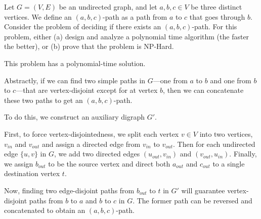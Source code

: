 \documentclass{article}
\begin{document}
\setcounter{section}{17}
\setcounter{exercise}{2}
\begin{exercise}
Let \( G=(V,E) \) be an undirected graph, and let \( a, b, c \in V \) be three distinct vertices.
We define an \( (a, b, c) \)-path as a path from \( a \) to \( c \) that goes through \( b \).
Consider the problem of deciding if there exists an \( (a, b, c) \)-path.
For this problem, either (a) design and analyze a polynomial time algorithm (the faster the better), or (b) prove that the problem is NP-Hard.
\end{exercise}

\begin{solution}

This problem has a polynomial-time solution.

Abstractly, if we can find two simple paths in $G$---one from $a$ to $b$ and one from $b$ to $c$---that are vertex-disjoint except for at vertex $b$, then we can concatenate these two paths to get an $(a,b,c)$-path.

To do this, we construct an auxiliary digraph $G'$.

First, to force vertex-disjointedness, we split each vertex $v \in V$ into two vertices, $v_{in}$ and $v_{out}$ and assign a directed edge from $v_{in}$ to $v_{out}$. Then for each undirected edge $\{u, v\}$ in $G$, we add two directed edges $(u_{out}, v_{in})$ and $(v_{out}, u_{in})$.
Finally, we assign $b_{out}$ to be the source vertex and direct both $a_{out}$ and $c_{out}$ to a single destination vertex $t$.

Now, finding two edge-disjoint paths from $b_{out}$ to $t$ in $G'$ will guarantee vertex-disjoint paths from $b$ to $a$ and $b$ to $c$ in $G$. The former path can be reversed and concatenated to obtain an $(a, b, c)$-path.

\begin{quote}%



\end{quote}
\end{solution}
\end{document}
